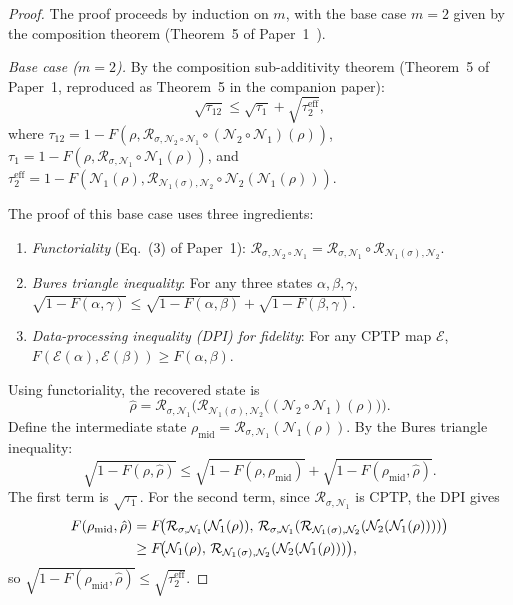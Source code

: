 \documentclass[prl,twocolumn,superscriptaddress,longbibliography]{revtex4-2}
\newcommand{\Petz}{\mathcal{R}}
\newcommand{\chan}{\mathcal{N}}
\newcommand{\tauasym}{\tau}
\begin{document}
\begin{proof}
The proof proceeds by induction on $m$, with the base case $m = 2$
given by the composition theorem (Theorem~5 of Paper~1~\cite{Huang2026}).

\emph{Base case ($m = 2$).}
By the composition sub-additivity theorem (Theorem~5 of
Paper~1, reproduced as Theorem~5 in the companion paper):
\begin{equation}
\sqrt{\tauasym_{12}} \leq \sqrt{\tauasym_1}
+ \sqrt{\tauasym_2^{\mathrm{eff}}},
\end{equation}
where $\tauasym_{12} = 1 - F(\rho, \Petz_{\sigma, \chan_2 \circ \chan_1}
\circ (\chan_2 \circ \chan_1)(\rho))$,
$\tauasym_1 = 1 - F(\rho, \Petz_{\sigma,\chan_1} \circ \chan_1(\rho))$,
and $\tauasym_2^{\mathrm{eff}} = 1 - F(\chan_1(\rho),
\Petz_{\chan_1(\sigma),\chan_2} \circ \chan_2(\chan_1(\rho)))$.

The proof of this base case uses three ingredients:
\begin{enumerate}
\item \emph{Functoriality} (Eq.~(3) of Paper~1):
$\Petz_{\sigma, \chan_2 \circ \chan_1}
= \Petz_{\sigma, \chan_1} \circ \Petz_{\chan_1(\sigma), \chan_2}$.
\item \emph{Bures triangle inequality}: For any three states
$\alpha, \beta, \gamma$,
$\sqrt{1 - F(\alpha, \gamma)} \leq
\sqrt{1 - F(\alpha, \beta)} + \sqrt{1 - F(\beta, \gamma)}$.
\item \emph{Data-processing inequality (DPI) for fidelity}: For any
CPTP map $\mathcal{E}$, $F(\mathcal{E}(\alpha), \mathcal{E}(\beta))
\geq F(\alpha, \beta)$.
\end{enumerate}

Using functoriality, the recovered state is
\begin{equation}
\hat{\rho} = \Petz_{\sigma, \chan_1}\!\big(
\Petz_{\chan_1(\sigma), \chan_2}\!\big(
(\chan_2 \circ \chan_1)(\rho)\big)\big).
\end{equation}
Define the intermediate state
$\rho_{\mathrm{mid}} = \Petz_{\sigma,\chan_1}(\chan_1(\rho))$.
By the Bures triangle inequality:
\begin{equation}
\sqrt{1 - F(\rho, \hat{\rho})}
\leq \sqrt{1 - F(\rho, \rho_{\mathrm{mid}})}
+ \sqrt{1 - F(\rho_{\mathrm{mid}}, \hat{\rho})}.
\end{equation}
The first term is $\sqrt{\tauasym_1}$.  For the second term,
since $\Petz_{\sigma,\chan_1}$ is CPTP, the DPI gives
\begin{align}
F(\rho_{\mathrm{mid}}, \hat{\rho})
&= F\!\big(\Petz_{\sigma,\chan_1}(\chan_1(\rho)),\,
\Petz_{\sigma,\chan_1}(\Petz_{\chan_1(\sigma),\chan_2}(\chan_2(\chan_1(\rho))))\big)
\notag \\
&\geq F\!\big(\chan_1(\rho),\,
\Petz_{\chan_1(\sigma),\chan_2}(\chan_2(\chan_1(\rho)))\big),
\end{align}
so $\sqrt{1 - F(\rho_{\mathrm{mid}}, \hat{\rho})}
\leq \sqrt{\tauasym_2^{\mathrm{eff}}}$.


\end{proof}
\end{document}
